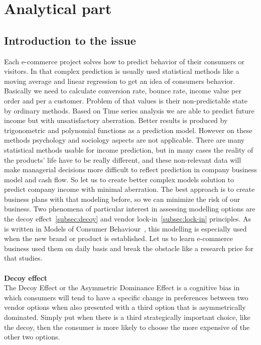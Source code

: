 
\chapter{Analytical part} \label{sec:analytical}

\section{Introduction to the issue} \label{sec:description}
Each e-commerce project solves how to predict behavior of their consumers or visitors.
In that complex prediction is usually used statistical methods like a moving average and linear regression to get an idea of consumers behavior.
Basically we need to calculate conversion rate, bounce rate, income value per order and per a customer.
Problem of that values is their non-predictable state by ordinary methods.
Based on Time series analysis we are able to predict future income but with unsatisfactory aberration.
Better results is produced by trigonometric and polynomial functions as a prediction model.
However on these methods psychology and sociology aspects are not applicable.
There are many statistical methods usable for income prediction, but in many cases the reality
of the products' life have to be really different, and these non-relevant data will make managerial decisions more
difficult to reflect prediction in company business model and cash flow.
So let us to create better complex models solution to predict company income with minimal aberration.
The best approach is to create business plans with that modeling before, so we can minimize the risk of our business.
Two phenomena of particular interest in assessing modelling options are the decoy effect~\ref{subsec:decoy} and vendor lock-in~\ref{subsec:lock-in} principles.
As is written in Models of Consumer Behaviour~\cite{patel}, this modelling is especially used when the new brand or product is established.
Let us to learn e-commerce business used them on daily basis and break the obstacle like a research price for that studies.\\
\\
\textbf{Decoy effect} \label{subsec:decoy}\\
The Decoy Effect or the Asymmetric Dominance Effect is a cognitive bias in which consumers will tend to have a specific
change in preferences between two vendor options when also presented with a third option that is asymmetrically dominated.
Simply put when there is a third strategically important choice, like the decoy, then the consumer is more likely to choose the more expensive of the other two options.
